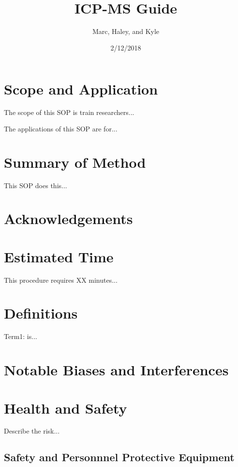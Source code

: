 \documentclass[12pt]{../SOP4_alpha}\usepackage[]{graphicx}\usepackage[]{color}
\title{ICP-MS Guide}
\date{2/12/2018}
\author{Marc, Haley, and Kyle}
\begin{document}
\maketitle

\section{Scope and Application}

\NP The scope of this SOP is train researchers...

\NP The applications of this SOP are for...

\section{Summary of Method}

\NP This SOP does this...

\tableofcontents

\newpage

\section{Acknowledgements}

\section{Estimated Time}

\NP This procedure requires XX minutes...

\section{Definitions}

\NP Term1: is...

\section{Notable Biases and Interferences}

\section{Health and Safety}

\NP Describe the risk...


\subsection{Safety and Personnnel Protective Equipment}
\end{document}
